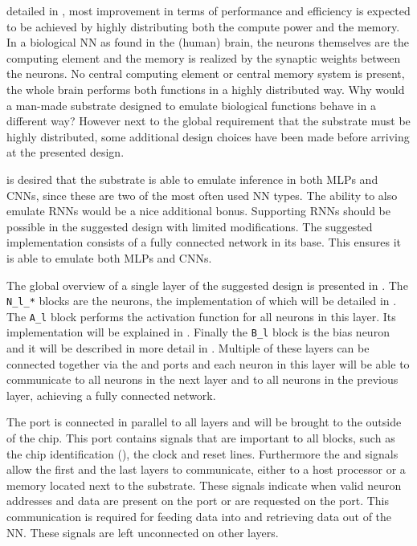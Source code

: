  detailed in , most improvement in terms of performance and efficiency is expected to be achieved by highly distributing both the compute power and the memory. In a biological \ac{NN} as found in the (human) brain, the neurons themselves are the computing element and the memory is realized by the synaptic weights between the neurons.  No central computing element or central memory system is present, the whole brain performs both functions in a highly distributed way. Why would a man-made substrate designed to emulate biological functions behave in a different way? However next to the global requirement that the substrate must be highly distributed, some additional design choices have been made before arriving at the presented design.


 is desired that the substrate is able to emulate inference in both \acp{MLP} and \acp{CNN}, since these are two of the most often used \ac{NN} types\cite{8192463}. The ability to also emulate \acp{RNN} would be a nice additional bonus. Supporting \acp{RNN} should be possible in the suggested design with limited modifications.  The suggested implementation consists of a fully connected network in its base. This ensures it is able to emulate both \acp{MLP} and \acp{CNN}.

The global overview of a single layer of the suggested design is presented in . The \texttt{N\_l\_*} blocks are the neurons, the implementation of which will be detailed in . The \texttt{A\_l} block performs the activation function for all neurons in this layer. Its implementation will be explained in . Finally the \texttt{B\_l} block is the bias neuron and it will be described in more detail in . Multiple of these layers can be connected together via the  and  ports and each neuron in this layer will be able to communicate to all neurons in the next layer and to all neurons in the previous layer, achieving a fully connected network.

The  port is connected in parallel to all layers and will be brought to the outside of the chip. This port contains signals that are important to all blocks, such as the chip identification (), the clock and reset lines. Furthermore the  and  signals allow the first and the last layers to communicate, either to a host processor or a memory located next to the substrate. These signals indicate when valid neuron addresses and data are present on the  port or are requested on the  port. This communication is required for feeding data into and retrieving data out of the \ac{NN}. These signals are left unconnected on other layers.

